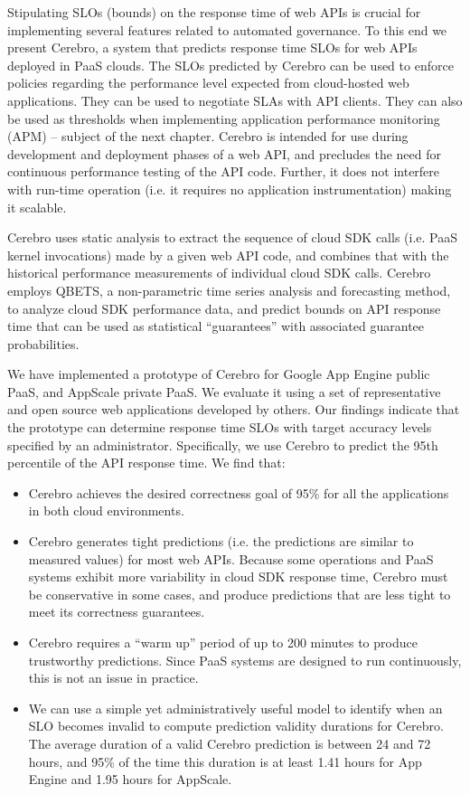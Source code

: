 Stipulating SLOs (bounds) on the response time of web APIs is crucial for 
implementing several features related to automated governance. To this end we present
Cerebro, a system that predicts response time SLOs for web APIs deployed 
in PaaS clouds. The SLOs predicted by Cerebro can be used to
enforce policies regarding the performance level expected from cloud-hosted
web applications. They can be used to negotiate SLAs with API clients.
They can also be used as
thresholds when implementing application performance monitoring (APM) --
subject of the next chapter.
Cerebro is intended for use during development and 
deployment phases of a web API, and 
precludes the need for continuous performance testing of the API code. 
Further, it does not interfere with run-time operation (i.e. it requires
no application instrumentation) making it scalable.

Cerebro uses static analysis to extract the sequence of cloud SDK 
calls (i.e. PaaS kernel invocations) made by a given web API code, 
and combines that with the
historical performance measurements of individual cloud SDK calls. 
Cerebro employs QBETS, a non-parametric time series analysis and 
forecasting method, to analyze cloud SDK performance data, and predict bounds
on API response time that can be used as statistical ``guarantees'' with
associated guarantee probabilities.

We have implemented a prototype of Cerebro for Google App Engine public PaaS,
and AppScale private PaaS. We evaluate it using a set of representative
and open source web applications developed by others.  
Our findings indicate that the prototype can determine response time SLOs
with target accuracy levels specified by an administrator. 
Specifically, we use Cerebro to predict the 95th percentile of the API response time. 
We find that:
\begin{itemize}
\item Cerebro achieves the desired correctness goal of 95\% for all the applications in both cloud environments.
\item Cerebro generates tight predictions (i.e.
the predictions are similar to measured values) for most web APIs.  Because
some operations and PaaS systems exhibit more variability in cloud SDK response
time, 
Cerebro must be conservative in some cases, and produce predictions that are less tight
to meet its correctness guarantees.  
\item Cerebro requires a ``warm up'' period of up to 200 minutes to produce trustworthy 
predictions. Since PaaS systems are designed to run continuously, this is not an issue in practice. 
\item We can use a simple yet administratively useful model to identify when an 
SLO becomes invalid to compute
prediction validity durations for Cerebro.  The average duration of a valid
Cerebro prediction is between 24 and 72 hours,
and 95\% of the time this duration is at least 
1.41 hours for App Engine and 1.95 hours for AppScale.
\end{itemize} 

